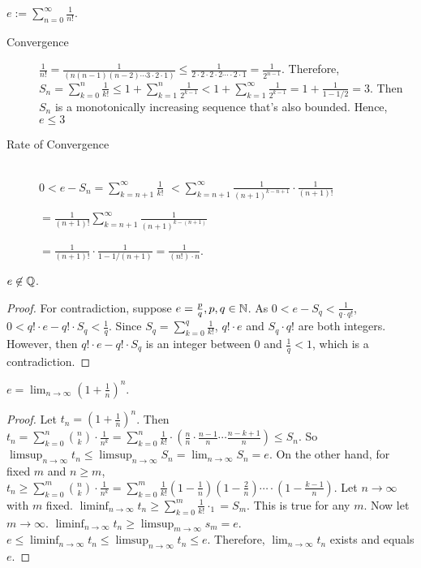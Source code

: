 \begin{definition}[e]
	$e:= \sum_{n=0}^{\infty}{\frac{1}{n!}}$.
	\begin{remark}
		\begin{description}
			\item[Convergence]
			      $\frac{1}{n!}=\frac{1}{(n(n-1)(n-2)\cdots 3\cdot 2 \cdot 1)}\le \frac{1}{2\cdot 2\cdot 2 \cdot 2 \cdots \cdot 2 \cdot 1}=\frac{1}{2^{n-1}}$. Therefore, $S_n= \sum_{k=0}^{n}{\frac{1}{k!}}\le 1+\sum_{k=1}^{n}{\frac{1}{2^{k-1}}}<1+\sum_{k=1}^{\infty }{\frac{1}{2^{k-1}}}=1+\frac{1}{1- 1/2}=3$. Then $S_n$ is a monotonically increasing sequence that's also bounded. Hence, $e \le 3$
			\item[Rate of Convergence]\hfill\\
			      $0<e-S_n=\sum_{k=n+1}^{\infty}{\frac{1}{k!}}$
			      $< \sum_{k=n+1}^{\infty}{\frac{1}{(n+1)^{k-n+1}}\cdot  \frac{1}{(n+1)!}}$

			      $= \frac{1}{(n+1)!} \sum_{k=n+1}^{\infty} \frac{1}{(n+1)^{k-(n+1)}}$

			      $=\frac{1}{(n+1)!} \cdot \frac{1}{1-1/(n+1)}=\frac{1}{(n!)\cdot n}$.

		\end{description}
	\end{remark}
\end{definition}

\begin{thm}[32]
	$e \not\in \mathbb{Q}$.
	\begin{proof}
		For contradiction, suppose $e=\frac{p}{q}, p,q \in \mathbb{N}$.
		As $0<e-S_q<\frac{1}{q\cdot q!}$, $0<q!\cdot e - q! \cdot S_q< \frac{1}{q}$. Since $S_q=\sum_{k=0}^{q}{\frac{1}{k!}}$, $q!\cdot e$ and $S_q \cdot q!$ are both integers.
		However, then $q! \cdot e - q! \cdot S_q$ is an integer between $0$ and $\frac{1}{q}<1$, which is a contradiction.
	\end{proof}
\end{thm}

\begin{thm}[31]
	$e= \lim_{n\to \infty}{(1+\frac{1}{n})^{n}}$.
	\begin{proof}
		Let $t_n=(1+\frac{1}{n})^{n}$. Then $t_n= \sum_{k=0}^{n}{\binom{n}{k} \cdot \frac{1}{n^{k}}}= \sum_{k=0}^{n}{\frac{1}{k!} \cdot (\frac{n}{n} \cdot \frac{n-1}{n} \cdots \frac{n-k+1}{n})} \le S_n$. So $\limsup_{n\to \infty}{t_n}\le \limsup_{n\to \infty}{S_n}=\lim_{n\to \infty}{S_n}=e$.
		On the other hand, for fixed $m$ and $n\ge m$, $t_n \ge \sum_{k=0}^{m}{\binom{n}{k} \cdot \frac{1}{n^{k}}}= \sum_{k=0}^{m}{\frac{1}{k!} (1-\frac{1}{n}) (1- \frac{2}{n}) \cdots \cdot (1-\frac{k-1}{n})}$. Let $n\to \infty$ with $m$ fixed.
		$\liminf_{n\to \infty}{t_n}\ge \sum_{k=0}^{m}{\frac{1}{k!} \cdot_1}=S_m$. This is true for any $m$.
		Now let $m\to \infty$. $\liminf_{n\to \infty}{t_{n}}\ge  \limsup_{m\to \infty}{s_{m}}=e$.
		$e \le \liminf_{n\to \infty}{t_{n}} \le \limsup_{n\to \infty}{t_{n}}\le e$.
		Therefore, $\lim_{n\to \infty}{t_{n}}$ exists and equals $e$.
	\end{proof}
\end{thm}


